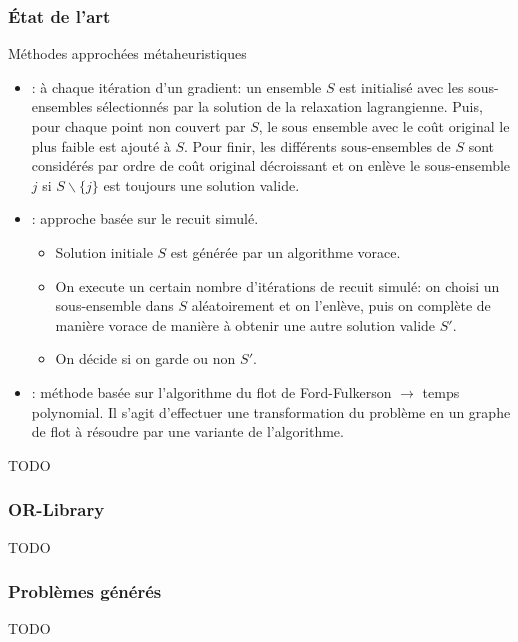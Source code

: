 \documentclass[aspectratio=169,11pt]{beamer}
\begin{document}
	\begin{frame}
		\frametitle{État de l'art}
		\begin{block}{Méthodes approchées métaheuristiques}
			\begin{itemize}
				\item \citeauthor{Beasley1990}: à chaque itération d'un gradient: un ensemble \(S\) est initialisé avec les sous-ensembles sélectionnés par la solution de la relaxation lagrangienne. Puis, pour chaque point non couvert par \(S\), le sous ensemble avec le coût original le plus faible est ajouté à \(S\). Pour finir, les différents sous-ensembles de \(S\) sont considérés par ordre de coût original décroissant et on enlève le sous-ensemble \(j\) si \(S \backslash \{j\}\) est toujours une solution valide.~\cite{Beasley1990}	
				\item \citeauthor{jacobs1995lsh}: approche basée sur le recuit simulé.~\cite{jacobs1995lsh}
					\begin{itemize}
						\item Solution initiale \(S\) est générée par un algorithme vorace.
						\item On execute un certain nombre d'itérations de recuit simulé:
						on choisi un sous-ensemble dans \(S\) aléatoirement
						et on l'enlève, puis on complète de manière vorace de manière à obtenir une autre solution valide \(S'\).
						\item On décide si on garde ou non \(S'\).
					\end{itemize}
				\item \citeauthor{Afif1995}: méthode basée sur l'algorithme du flot de Ford-Fulkerson \(\rightarrow\) temps polynomial. Il s'agit d'effectuer une transformation du problème en un graphe de flot à résoudre par une variante de l'algorithme.~\cite{Afif1995}
			\end{itemize}
		\end{block}
	\end{frame}


	\begin{frame}
		\centering TODO
	\end{frame}


	\begin{frame}
		\frametitle{OR-Library}
		\centering TODO
	\end{frame}

	\begin{frame}
		\frametitle{Problèmes générés}
		\centering TODO
	\end{frame}
\end{document}
